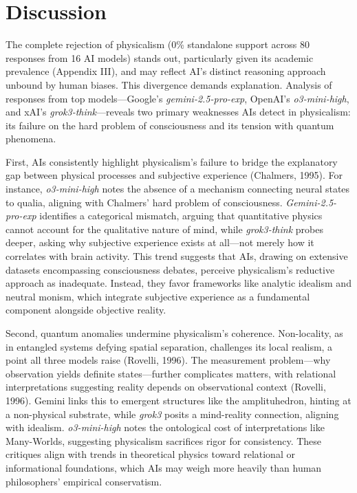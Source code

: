 \documentclass[11pt]{article}
\begin{document}
\section{Discussion}
The complete rejection of physicalism (0\% standalone support across 80 responses from 16 AI models) stands out, particularly given its academic prevalence (Appendix III), and may reflect AI’s distinct reasoning approach unbound by human biases. This divergence demands explanation. Analysis of responses from top models—Google’s \textit{gemini-2.5-pro-exp}, OpenAI’s \textit{o3-mini-high}, and xAI’s \textit{grok3-think}—reveals two primary weaknesses AIs detect in physicalism: its failure on the hard problem of consciousness and its tension with quantum phenomena.

First, AIs consistently highlight physicalism’s failure to bridge the explanatory gap between physical processes and subjective experience (Chalmers, 1995). For instance, \textit{o3-mini-high} notes the absence of a mechanism connecting neural states to qualia, aligning with Chalmers’ hard problem of consciousness. \textit{Gemini-2.5-pro-exp} identifies a categorical mismatch, arguing that quantitative physics cannot account for the qualitative nature of mind, while \textit{grok3-think} probes deeper, asking why subjective experience exists at all—not merely how it correlates with brain activity. This trend suggests that AIs, drawing on extensive datasets encompassing consciousness debates, perceive physicalism’s reductive approach as inadequate. Instead, they favor frameworks like analytic idealism and neutral monism, which integrate subjective experience as a fundamental component alongside objective reality.

Second, quantum anomalies undermine physicalism’s coherence. Non-locality, as in entangled systems defying spatial separation, challenges its local realism, a point all three models raise (Rovelli, 1996). The measurement problem—why observation yields definite states—further complicates matters, with relational interpretations suggesting reality depends on observational context (Rovelli, 1996). Gemini links this to emergent structures like the amplituhedron, hinting at a non-physical substrate, while \textit{grok3} posits a mind-reality connection, aligning with idealism. \textit{o3-mini-high} notes the ontological cost of interpretations like Many-Worlds, suggesting physicalism sacrifices rigor for consistency. These critiques align with trends in theoretical physics toward relational or informational foundations, which AIs may weigh more heavily than human philosophers’ empirical conservatism.
\end{document}
